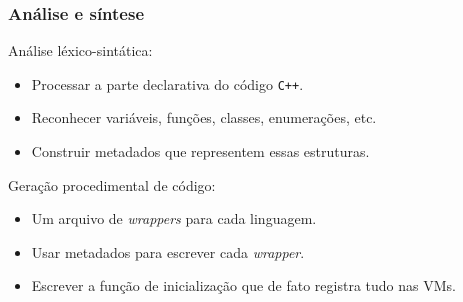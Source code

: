 \documentclass[brazil]{beamer}
\begin{document}
\begin{frame}[fragile]
  \frametitle{Análise e síntese}
  \pause
  Análise léxico-sintática:
  \begin{itemize}
    \pause
    \item Processar a parte declarativa do código \texttt{C++}.
    \pause
    \item Reconhecer variáveis, funções, classes, enumerações, etc.
    \pause
    \item Construir metadados que representem essas estruturas.
  \end{itemize}
  \pause
  Geração procedimental de código:
  \begin{itemize}
    \pause
    \item Um arquivo de \textit{wrappers} para cada linguagem.
    \pause
    \item Usar metadados para escrever cada \textit{wrapper}.
    \pause
    \item Escrever a função de inicialização que de fato registra tudo nas VMs.
  \end{itemize}
\end{frame}
\end{document}
